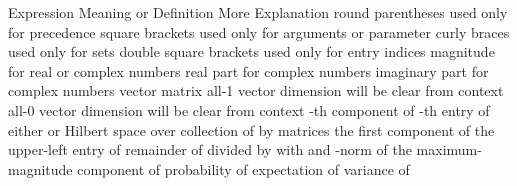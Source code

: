 \starttitle [title={Notation}]

\starttable[|l|l|l|] \HL
\NC Expression \VL Meaning or Definition \VL More Explanation \SR \HL
\NC {} \VL round parentheses \VL used only for precedence \AR \HL
\NC {} \VL square brackets \VL used only for arguments or parameter \AR \HL
\NC {} \VL curly braces \VL used only for sets \AR \HL
\NC {} \VL double square brackets \VL used only for entry indices \AR \HL
\NC {} \VL magnitude \VL for real or complex numbers \AR \HL
\NC {} \VL real part \VL for complex numbers \AR \HL
\NC {} \VL imaginary part \VL for complex numbers \AR \HL
\NC {} \VL vector \VL  \AR \HL
\NC {} \VL matrix \VL  \AR \HL
\NC {} \VL all-1 vector \VL dimension will be clear from context \AR \HL
\NC {} \VL all-0 vector \VL dimension will be clear from context \AR \HL
\NC {} \VL {}-th component of  \VL  \AR \HL
\NC {} \VL {}-th entry of  \VL  \AR \HL
\NC {} \VL either  or  \VL  \AR \HL
\NC {} \VL Hilbert space  over  \VL  \AR \HL
\NC {} \VL collection of  by  matrices \VL  \AR \HL
\NC {} \VL the first component of  \VL  \AR \HL
\NC {} \VL the upper-left entry of  \VL  \AR \HL
\NC {} \VL remainder of  divided by  \VL with  and  \AR \HL
\NC {} \VL {}-norm of  \VL {} \AR \HL
\NC {} \VL the maximum-magnitude \VL  \AR
\NC  \VL component of  \VL  \AR \HL
\NC {} \VL probability of  \VL  \AR \HL
\NC {} \VL expectation of  \VL  \AR \HL
\NC {} \VL variance of  \VL  \AR \HL
\stoptable

\stopchapter
